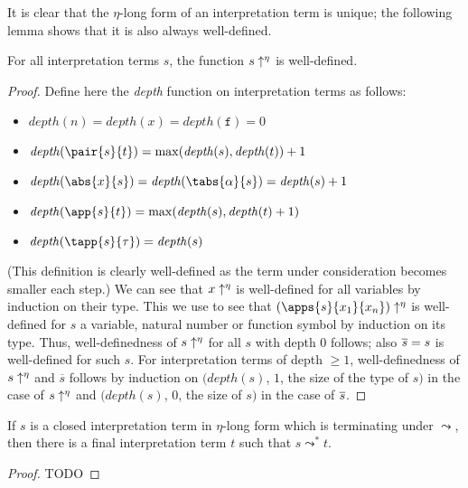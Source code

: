 It is clear that the $\eta$-long form of an interpretation term is
unique; the following lemma shows that it is also always well-defined.

\begin{lemma}
For all interpretation terms $s$, the function $s\uparrow^\eta$ is
well-defined.
\end{lemma}

\begin{proof}
Define here the \emph{depth} function on interpretation terms as
follows:
\begin{itemize}
\item $\mathit{depth}(n) = \mathit{depth}(x) = \mathit{depth}(\mathtt{f})
  = 0$
\item $\mathit{depth}(\pair{s}{t}) = \max(\mathit{depth}(s),\mathit{
  depth}(t)) + 1$
\item $\mathit{depth}(\abs{x}{s}) = \mathit{depth}(\tabs{\alpha}{s}) =
  \mathit{depth}(s) + 1$
\item $\mathit{depth}(\app{s}{t}) = \max(\mathit{depth}(s),\mathit{
  depth}(t)+1)$
\item $\mathit{depth}(\tapp{s}{\tau}) = \mathit{depth}(s)$
\end{itemize}
(This definition is clearly well-defined as the term under consideration
becomes smaller each step.)
We can see that $x\uparrow^\eta$ is well-defined for all variables by
induction on their type.  This we use to see that $\etalong{(\apps{s}{
x_1}{x_n})}$ is well-defined for $s$ a variable, natural number or
function symbol by induction on its type.  Thus, well-definedness of
$s\uparrow^\eta$ for all $s$ with depth $0$ follows; also $\overline{
s} = s$ is well-defined for such $s$.
For interpretation terms of depth $\geq 1$, well-definedness of
$s\uparrow^\eta$ and $\overline{s}$ follows by induction on
$(\mathit{depth}(s)$, $1$, the size of the type of $s)$ in the case
of $s\uparrow^\eta$ and
$(\mathit{depth}(s)$, $0$, the size of $s)$ in the case of
$\overline{s}$.
\end{proof}

\begin{lemma}
If $s$ is a closed interpretation term in $\eta$-long form which is
terminating under $\leadsto$, then there is a final interpretation term
$t$ such that $s \leadsto^* t$.
\end{lemma}

\begin{proof}
TODO
\end{proof}

